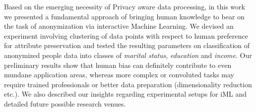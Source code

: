 \documentclass{llncs}
\begin{document}
Based on the emerging necessity of Privacy aware data processing, in this work we presented a fundamental approach of bringing human knowledge to bear on the task of anonymization via interactive Machine Learning. We devised an experiment involving clustering of data points with respect to human preference for attribute preservation and tested the resulting parameters on classification of anonymized people data into classes of \textit{marital status}, \textit{education} and \textit{income}. Our preliminary results show that human bias can definitely contribute to even mundane application areas, whereas more complex or convoluted tasks may require trained professionals or better data preparation (dimensionality reduction etc.). We also described our insights regarding experimental setups for iML and detailed future possible research venues.




\end{document}
